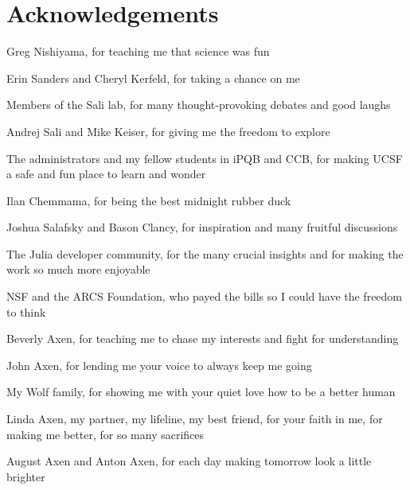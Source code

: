 \chapter*{Acknowledgements}

\begin{centering}
	Greg Nishiyama, for teaching me that science was fun

	Erin Sanders and Cheryl Kerfeld, for taking a chance on me

	Members of the Sali lab, for many thought-provoking debates and good laughs

	Andrej Sali and Mike Keiser, for giving me the freedom to explore

	The administrators and my fellow students in iPQB and CCB, for making UCSF a safe and fun place to learn and wonder

	Ilan Chemmama, for being the best midnight rubber duck

	Joshua Salafsky and Bason Clancy, for inspiration and many fruitful discussions

	The Julia developer community, for the many crucial insights and for making the work so much more enjoyable

	NSF and the ARCS Foundation, who payed the bills so I could have the freedom to think

	Beverly Axen, for teaching me to chase my interests and fight for understanding

	John Axen, for lending me your voice to always keep me going

	My Wolf family, for showing me with your quiet love how to be a better human

	Linda Axen, my partner, my lifeline, my best friend, for your faith in me, for making me better, for so many sacrifices

	August Axen and Anton Axen, for each day making tomorrow look a little brighter

\end{centering}

